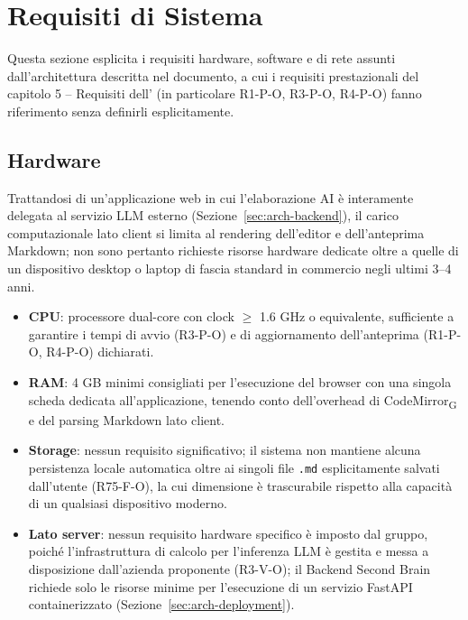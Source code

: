 \section{Requisiti di Sistema}
\label{sec:requisiti-sistema}
Questa sezione esplicita i requisiti hardware, software e di rete assunti dall'architettura descritta nel documento, a cui i requisiti prestazionali del capitolo 5 -- Requisiti dell' (in particolare R1-P-O, R3-P-O, R4-P-O) fanno riferimento senza definirli esplicitamente.

\subsection{Hardware}
Trattandosi di un'applicazione web in cui l'elaborazione AI è interamente delegata al servizio LLM esterno (Sezione~\ref{sec:arch-backend}), il carico computazionale lato client si limita al rendering dell'editor e dell'anteprima Markdown; non sono pertanto richieste risorse hardware dedicate oltre a quelle di un dispositivo desktop o laptop di fascia standard in commercio negli ultimi 3--4 anni.

\begin{itemize}
	\item \textbf{CPU}: processore dual-core con clock $\geq$ 1.6 GHz o equivalente, sufficiente a garantire i tempi di avvio (R3-P-O) e di aggiornamento dell'anteprima (R1-P-O, R4-P-O) dichiarati.
	\item \textbf{RAM}: 4 GB minimi consigliati per l'esecuzione del browser con una singola scheda dedicata all'applicazione, tenendo conto dell'overhead di CodeMirror\textsubscript{G} e del parsing Markdown lato client.
	\item \textbf{Storage}: nessun requisito significativo; il sistema non mantiene alcuna persistenza locale automatica oltre ai singoli file \texttt{.md} esplicitamente salvati dall'utente (R75-F-O), la cui dimensione è trascurabile rispetto alla capacità di un qualsiasi dispositivo moderno.
	\item \textbf{Lato server}: nessun requisito hardware specifico è imposto dal gruppo, poiché l'infrastruttura di calcolo per l'inferenza LLM è gestita e messa a disposizione dall'azienda proponente (R3-V-O); il Backend Second Brain richiede solo le risorse minime per l'esecuzione di un servizio FastAPI containerizzato (Sezione~\ref{sec:arch-deployment}).
\end{itemize}

